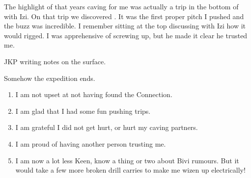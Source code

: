 The highlight of that years caving for me was actually a trip in the
bottom of  with Izi. On that trip we discovered
. It was the first proper pitch I pushed and the
buzz was incredible. I remember sitting at the top discussing with Izi
how it would rigged. I was apprehensive of screwing up, but he made it
clear he trusted me.

\begin{marginfigure}
\checkoddpage \ifoddpage \forcerectofloat \else \forceversofloat \fi
\centering
 \caption{JKP writing notes on the surface. }
 \label{JKP sunset notes}
\end{marginfigure}

Somehow the expedition ends.

\begin{enumerate}
\def\labelenumi{\arabic{enumi}.}
\item
  I am not upset at not having found the Connection.
\item
  I am glad that I had some fun pushing trips.
\item
  I am grateful I did not get hurt, or hurt my caving partners.
\item
  I am proud of having another person trusting me.
\item
  I am now a lot less Keen, know a thing or two about Bivi rumours. But
  it would take a few more broken drill carries to make me wizen up
  electrically!
\end{enumerate}

